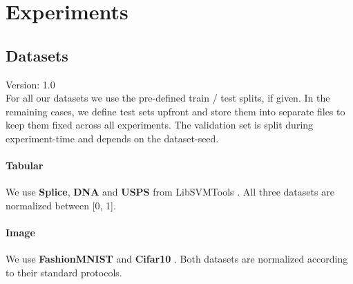 \documentclass[]{article}
\begin{document}
\section{Experiments}

\subsection{Datasets}\label{sec:datasets}
{\color{red} Version: 1.0}\\
For all our datasets we use the pre-defined train / test splits, if given. 
In the remaining cases, we define test sets upfront and store them into separate files to keep them fixed across all experiments.
The validation set is split during experiment-time and depends on the dataset-seed.

\paragraph{Tabular}
We use \textbf{Splice}, \textbf{DNA} and \textbf{USPS} from LibSVMTools \cite{libsvmtools}.
All three datasets are normalized between [0, 1].

\paragraph{Image}
We use \textbf{FashionMNIST} \cite{xiao2017fashion} and \textbf{Cifar10} \cite{krizhevsky2009learning}.
Both datasets are normalized according to their standard protocols. 
\end{document}
